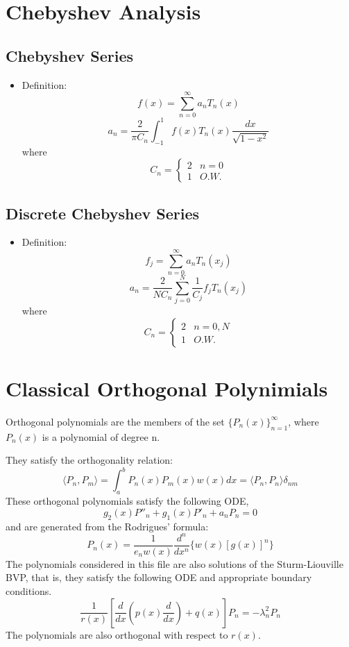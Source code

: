 \documentclass[11pt]{article}
\begin{document}
\section{Chebyshev Analysis}
\subsection{Chebyshev Series}
\begin{itemize}
\item Definition:
\[f(x)=\sum_{n=0}^{\infty}a_nT_n(x)\]
\[a_n=\frac{2}{\pi C_n}\int_{-1}^{1}f(x)T_n(x)\frac{dx}{\sqrt{1-x^2}}\]
where
\[ C_n = \left\{ \begin{array}{cc}  2 & n=0\\ 1 & O.W. \end{array}\right. \]
\end{itemize}

\subsection{Discrete Chebyshev Series}
\begin{itemize}
\item Definition:
\[f_j=\sum_{n=0}^{\infty}a_nT_n(x_j)\]
\[a_n=\frac{2}{NC_n}\sum_{j=0}^{N}\frac{1}{C_j}f_jT_n(x_j)\]
where
\[ C_n = \left\{ \begin{array}{cc}  2 & n=0,N\\ 1 & O.W. \end{array}\right.\]
\end{itemize}

\section{Classical Orthogonal Polynimials}
Orthogonal polynomials are the members of the set $\{P_n(x)\}_{n=1}^{\infty}$, where $P_n(x)$ is a polynomial of degree n.

They satisfy the orthogonality relation:
\[\langle P_n,P_m \rangle = \int_a^b P_n(x)P_m(x)w(x)dx  = \langle P_n,P_n \rangle \delta_{nm}\]
These orthogonal polynomials satisfy the following ODE,
\[g_2(x) P''_n + g_1(x)P'_n + a_nP_n = 0\]
and are generated from the Rodrigues' formula:
\[P_n(x) = \frac{1}{e_nw(x)}\frac{d^n}{dx^n}\{w(x)[g(x)]^n\}\]
The polynomials considered in this file are also solutions of the Sturm-Liouville BVP, that is, they satisfy the following ODE and appropriate boundary conditions.
\[ \frac{1}{r(x)}\left[\frac{d}{dx}\left(p(x)\frac{d}{dx}\right)+q(x)\right]P_n = - \lambda_n^2P_n\]
The polynomials are also orthogonal with respect to $r(x)$.
\end{document}
